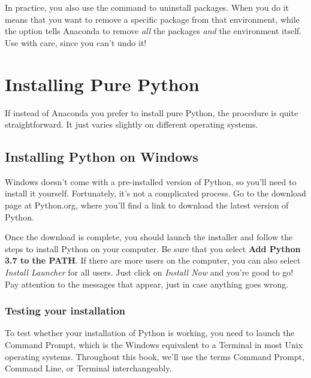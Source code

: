 \sloppy In practice, you also use the  command to uninstall packages. When you do  it means that you want to remove a specific package from that environment, while the  option tells Anaconda to remove \emph{all} the packages \emph{and} the environment itself. Use with care, since you can't undo it!

\section{Installing Pure Python}\label{sec:installing-pure-python}
If instead of Anaconda you prefer to install pure Python, the procedure is quite straightforward. It just varies slightly on different operating systems.

\subsection{Installing Python on Windows}\label{subsec:python-installation-on-windows}
Windows doesn't come with a pre-installed version of Python, so you'll need to install it yourself. Fortunately, it's not a complicated process. Go to the download page at Python.org, where you'll find a link to download the latest version of Python.


Once the download is complete, you should launch the installer and follow the steps to install Python on your computer. Be sure that you select \textbf{Add Python 3.7 to the PATH}. If there are more users on the computer, you can also select \emph{Install Launcher} for all users. Just click on \textit{Install Now} and you're good to go! Pay attention to the messages that appear, just in case anything goes wrong.

\subsubsection{Testing your installation}
To test whether your installation of Python is working, you need to launch the Command Prompt, which is the Windows equivalent to a Terminal in most Unix operating systems. Throughout this book, we'll use the terms Command Prompt, Command Line, or Terminal interchangeably.

